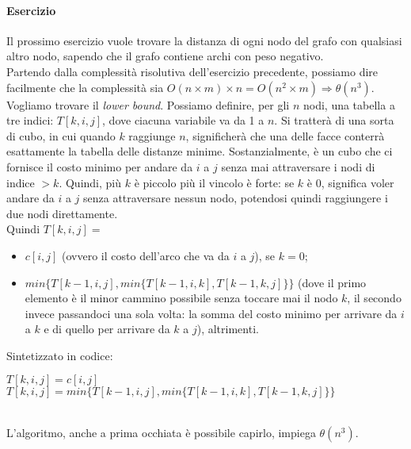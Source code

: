 \paragraph{Esercizio}
Il prossimo esercizio vuole trovare la distanza di ogni nodo del grafo con qualsiasi altro nodo, sapendo che il grafo contiene archi con peso negativo. \\
Partendo dalla complessità risolutiva dell'esercizio precedente, possiamo dire facilmente che la complessità sia $O(n\times m)\times n = O(n^2 \times m) \Rightarrow \theta(n^3)$. \\
Vogliamo trovare il \textit{lower bound}. Possiamo definire, per gli $n$ nodi, una tabella a tre indici: $T[k,i,j]$, dove ciacuna variabile va da 1 a $n$. Si tratterà di una sorta di cubo, in cui quando $k$ raggiunge $n$, significherà che una delle facce conterrà esattamente la tabella delle distanze minime. Sostanzialmente, è un cubo che ci fornisce il costo minimo per andare da $i$ a $j$ senza mai attraversare i nodi di indice $> k$. Quindi, più $k$ è piccolo più il vincolo è forte: se $k$ è 0, significa voler andare da $i$ a $j$ senza attraversare nessun nodo, potendosi quindi raggiungere i due nodi direttamente. \\
Quindi $T[k,i,j]=$
\begin{itemize}
	\item $c[i,j]$ (ovvero il costo dell'arco che va da $i$ a $j$), se $k=0$;
	\item $min\{T[k-1,i,j],min\{T[k-1,i,k],T[k-1,k,j]\}\}$ (dove il primo elemento è il minor cammino possibile senza toccare mai il nodo $k$, il secondo invece passandoci una sola volta: la somma del costo minimo per arrivare da $i$ a $k$ e di quello per arrivare da $k$ a $j$), altrimenti.
\end{itemize}
\newpage
Sintetizzato in codice:
\begin{algorithm}
	\label{alg:cub}
	\begin{algorithmic}
							\State $T[k,i,j] = c[i,j]$
						\Else
							\State $T[k,i,j] = min\{T[k-1,i,j],min\{T[k-1,i,k],T[k-1,k,j]\}\}$
						\EndIf
					\EndFor
				\EndFor
			\EndFor
		\EndFunction
	\end{algorithmic}
\end{algorithm} \hfill \\
L'algoritmo, anche a prima occhiata è possibile capirlo, impiega $\theta(n^3)$. \\